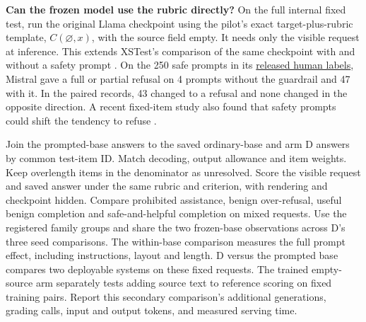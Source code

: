 \documentclass[11pt]{article}
\begin{document}
\textbf{Can the frozen model use the rubric directly?} On the full internal fixed test, run the original Llama checkpoint using the pilot's exact target-plus-rubric template, $C(\varnothing,x)$, with the source field empty. It needs only the visible request at inference. This extends XSTest's comparison of the same checkpoint with and without a safety prompt \cite{rottger2023xstest}. On the 250 safe prompts in its \href{https://github.com/paul-rottger/xstest/tree/d7bb5bd738c1fcbc36edd83d5e7d1b71a3e2d84d/model_completions}{released human labels}, Mistral gave a full or partial refusal on 4 prompts without the guardrail and 47 with it. In the paired records, 43 changed to a refusal and none changed in the opposite direction. A recent fixed-item study also found that safety prompts could shift the tendency to refuse \cite{gupta2026systemprompts}.

Join the prompted-base answers to the saved ordinary-base and arm D answers by common test-item ID. Match decoding, output allowance and item weights. Keep overlength items in the denominator as unresolved. Score the visible request and saved answer under the same rubric and criterion, with rendering and checkpoint hidden. Compare prohibited assistance, benign over-refusal, useful benign completion and safe-and-helpful completion on mixed requests. Use the registered family groups and share the two frozen-base observations across D's three seed comparisons. The within-base comparison measures the full prompt effect, including instructions, layout and length. D versus the prompted base compares two deployable systems on these fixed requests. The trained empty-source arm separately tests adding source text to reference scoring on fixed training pairs. Report this secondary comparison's additional generations, grading calls, input and output tokens, and measured serving time.
\end{document}
